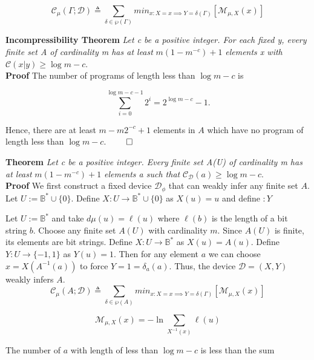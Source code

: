 \documentclass[11pt]{article}
\newcommand{\B}{\mathbb{B}}
\begin{document}
$$ \mathcal{C}_{\mu}(\Gamma ; \mathcal{D}) \triangleq \sum_{\delta \in \wp(\Gamma)} min_{x : X = x \implies Y = \delta(\Gamma) } [\mathcal{M}_{\mu, X} (x)]	$$ 

\textbf{Incompressibility Theorem} \quad \textit{Let c be a positive integer. For each fixed y, every finite set A of cardinality m has at least} $ m(1 - m^{-c}) + 1 $ \textit{elements x with} $ \mathcal{C}(x|y) \geq \log m - c $. \\

\textbf{Proof} \quad The number of programs of length less than $ \log m - c $ is 

$$ \sum_{i = 0}^{\log m - c - 1} {2^i} = 2^{\log m - c} - 1. $$

Hence, there are at least $ m - m2^{-c} + 1 $ elements in $ A $ which have no program of length less than $ \log m - c $. $ \hfill \qed $ \\


\bigskip
\bigskip


\textbf{Theorem} \quad \textit{Let c be a positive integer. Every finite set A(U) of cardinality m has at least} $ m(1 - m^{-c}) + 1 $ \textit{elements a such that} $ \mathcal{C}_\mathcal{D}( a ) \geq \log m - c $. \\


\textbf{Proof} \quad We first construct a fixed device $ \mathcal{D}_{\phi} $ that can weakly infer any finite set $ A $. Let $ U := \B^{*} \cup \{0\} $. Define $ X: U \rightarrow \B^{*} \cup \{0\} $ as $ X(u) = u $ and define $ :Y $


\bigskip
Let $ U := \B^{*} $ and take $ d\mu(u) = \ell(u) $ where $ \ell(b) $ is the length of a bit string $ b $. Choose any finite set $ A(U) $ with cardinality $ m $. Since $ A(U) $ is finite, its elements are bit strings. Define $ X: U \rightarrow \B^{*} $ as $ X(u) = A(u) $. Define $ Y: U \rightarrow \{-1, 1\} $ as $ Y(u) = 1 $. Then for any element $ a $ we can choose $ x = X(A^{-1}(a)) $ to force $ Y = 1 = \delta_a(a) $. Thus, the device $ \mathcal{D} = (X, Y) $ weakly infers $ A $. \\

$$ \mathcal{C}_{\mu}(A ; \mathcal{D}) \triangleq \sum_{\delta \in \wp(A)} min_{x : X = x \implies Y = \delta(\Gamma) } [\mathcal{M}_{\mu, X} (x)]	$$ 

$$ \mathcal{M}_{\mu, X} (x) = - \ln \sum_{X^{-1}(x)} {\ell(u)} $$


The number of $ a $ with length of less than $ \log m - c $ is less than the sum
\end{document}
